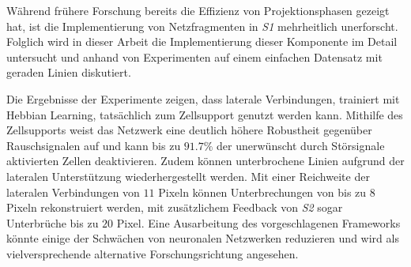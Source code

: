 Während frühere Forschung bereits die Effizienz von Projektionsphasen gezeigt hat, ist die Implementierung von Netzfragmenten in \emph{S1} mehrheitlich unerforscht.
Folglich wird in dieser Arbeit die Implementierung dieser Komponente im Detail untersucht und anhand von Experimenten auf einem einfachen Datensatz mit geraden Linien diskutiert.

Die Ergebnisse der Experimente zeigen, dass laterale Verbindungen, trainiert mit Hebbian Learning, tatsächlich zum Zellsupport genutzt werden kann.
Mithilfe des Zellsupports weist das Netzwerk eine deutlich höhere Robustheit gegenüber Rauschsignalen auf und kann bis zu $91.7\%$ der unerwünscht durch Störsignale aktivierten Zellen deaktivieren. Zudem können unterbrochene Linien aufgrund der lateralen Unterstützung wiederhergestellt werden. Mit einer Reichweite der lateralen Verbindungen von $11$ Pixeln können Unterbrechungen von bis zu $8$ Pixeln rekonstruiert werden, mit zusätzlichem Feedback von \emph{S2} sogar Unterbrüche bis zu $20$ Pixel. Eine Ausarbeitung des vorgeschlagenen Frameworks könnte einige der Schwächen von neuronalen Netzwerken reduzieren und wird als vielversprechende alternative Forschungsrichtung angesehen.
